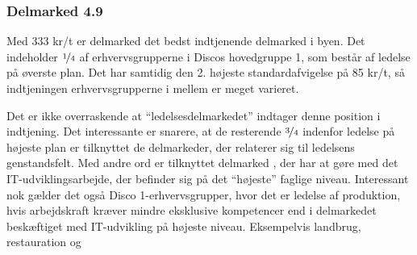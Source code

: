 



%
\subsubsection{Delmarked 4.9}
%

Med 333 kr/t er delmarked  det bedst indtjenende delmarked i byen. Det indeholder $\nicefrac{1}{4}$ af erhvervsgrupperne i Discos hovedgruppe 1, som består af ledelse på øverste plan. Det har samtidig den 2. højeste standardafvigelse på 85 kr/t, så indtjeningen erhvervsgrupperne i mellem er meget varieret.  


Det er ikke overraskende at “ledelsesdelmarkedet” indtager denne position i indtjening. Det interessante er snarere, at de  resterende $\nicefrac{3}{4}$ indenfor ledelse på højeste plan er tilknyttet de delmarkeder, der relaterer sig til ledelsens genstandsfelt. Med andre ord er  tilknyttet delmarked , der har at gøre med det IT-udviklingsarbejde, der befinder sig på det “højeste” faglige niveau. Interessant nok gælder det også Disco 1-erhvervsgrupper, hvor det er ledelse af produktion, hvis arbejdskraft kræver mindre eksklusive kompetencer end i delmarkedet beskæftiget med IT-udvikling på højeste niveau. Eksempelvis landbrug, restauration og  %




